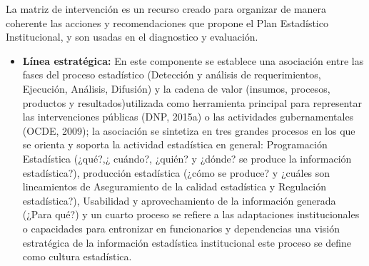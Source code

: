 \documentclass[
]{book}
\begin{document}
La matriz de intervención es un recurso creado para organizar de manera coherente las acciones y recomendaciones que propone el Plan Estadístico Institucional, y son usadas en el diagnostico y evaluación.

\begin{itemize}
\item
  \textbf{Línea estratégica:} En este componente se establece una asociación entre las fases del proceso estadístico (Detección y análisis de requerimientos, Ejecución, Análisis, Difusión) y la cadena de valor (insumos, procesos, productos y resultados)utilizada como herramienta principal para representar las intervenciones públicas (DNP, 2015a) o las actividades gubernamentales (OCDE, 2009); la asociación se sintetiza en tres grandes procesos en los que se orienta y soporta la actividad estadística en general: Programación Estadística (¿qué?,¿ cuándo?, ¿quién? y ¿dónde? se produce la información estadística?), producción estadística (¿cómo se produce? y ¿cuáles son lineamientos de Aseguramiento de la calidad estadística y Regulación estadística?), Usabilidad y aprovechamiento de la información generada (¿Para qué?) y un cuarto proceso se refiere a las adaptaciones institucionales o capacidades para entronizar en funcionarios y dependencias una visión estratégica de la información estadística institucional este proceso se define como cultura estadística.


\end{itemize}
\end{document}
